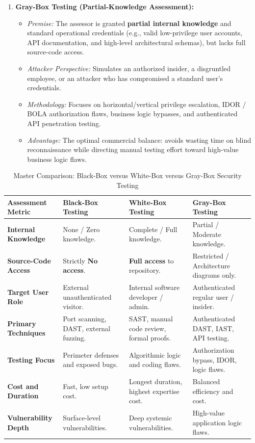 \begin{enumerate}
\item \textbf{Gray-Box Testing (Partial-Knowledge Assessment):}
\begin{itemize}
\item \textit{Premise:} The assessor is granted \textbf{partial internal knowledge} and standard operational credentials (e.g., valid low-privilege user accounts, API documentation, and high-level architectural schemas), but lacks full source-code access.
\item \textit{Attacker Perspective:} Simulates an authorized insider, a disgruntled employee, or an attacker who has compromised a standard user's credentials.
\item \textit{Methodology:} Focuses on horizontal/vertical privilege escalation, IDOR / BOLA authorization flaws, business logic bypasses, and authenticated API penetration testing.
\item \textit{Advantage:} The optimal commercial balance: avoids wasting time on blind reconnaissance while directing manual testing effort toward high-value business logic flaws.
\end{itemize}
\end{enumerate}

\begin{table}[htbp]
\centering
\caption{Master Comparison: Black-Box versus White-Box versus Gray-Box Security Testing}
\label{tab:black_white_gray_box}
\begin{tabularx}{\textwidth}{p{3.2cm} X X X}
\toprule
\textbf{Assessment Metric} & \textbf{Black-Box Testing} & \textbf{White-Box Testing} & \textbf{Gray-Box Testing} \\
\midrule
\textbf{Internal Knowledge} & None / Zero knowledge. & Complete / Full knowledge. & Partial / Moderate knowledge. \\
\textbf{Source-Code Access} & Strictly \textbf{No access}. & \textbf{Full access} to repository. & Restricted / Architecture diagrams only. \\
\textbf{Target User Role} & External unauthenticated visitor. & Internal software developer / admin. & Authenticated regular user / insider. \\
\textbf{Primary Techniques} & Port scanning, DAST, external fuzzing. & SAST, manual code review, formal proofs. & Authenticated DAST, IAST, API testing. \\
\textbf{Testing Focus} & Perimeter defenses and exposed bugs. & Algorithmic logic and coding flaws. & Authorization bypass, IDOR, logic flaws. \\
\textbf{Cost and Duration} & Fast, low setup cost. & Longest duration, highest expertise cost. & Balanced efficiency and cost. \\
\textbf{Vulnerability Depth} & Surface-level vulnerabilities. & Deep systemic vulnerabilities. & High-value application logic flaws. \\
\bottomrule
\end{tabularx}
\end{table}

